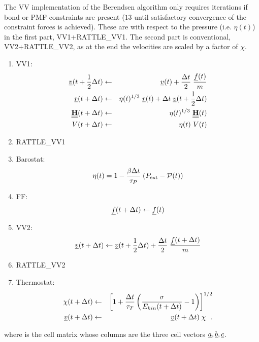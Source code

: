 The VV implementation of the Berendsen algorithm only requires iterations
if bond or PMF constraints are present ($13$ until satisfactory
convergence of the constraint forces is achieved).  These are
with respect to the pressure (i.e. $\eta (t)$) in the first part,
VV1+RATTLE\_VV1.  The second part is conventional, VV2+RATTLE\_VV2,
as at the end the velocities are scaled by a factor of $\chi$.
\begin{enumerate}
\item VV1:
\begin{eqnarray}
\mbox{$\underline{v}$}(t + {1 \over 2} \Delta t) &\leftarrow& \mbox{$\underline{v}$}(t) +
{\Delta t \over 2} \; {\mbox{$\underline{f}$}(t) \over m} \nonumber \\
\mbox{$\underline{r}$}(t + \Delta t) &\leftarrow& \eta (t)^{1/3}~\mbox{$\underline{r}$}(t) + \Delta t \;
\mbox{$\underline{v}$}(t + {1 \over 2} \Delta t) \\
\mbox{$\underline{\underline{\bf H}}$}(t + \Delta t) &\leftarrow&  \eta (t)^{1/3}~\mbox{$\underline{\underline{\bf H}}$}(t) \nonumber \\
V(t + \Delta t) &\leftarrow& \eta (t)~V(t) \nonumber
\end{eqnarray}
\item RATTLE\_VV1
\item Barostat:
\begin{equation}
\eta (t) = 1 - {\beta \Delta t \over \tau_{P}} \; (P_{\rm ext} -
{\cal P}(t))
\end{equation}
\item FF:
\begin{equation}
\mbox{$\underline{f}$}(t + \Delta t) \leftarrow \mbox{$\underline{f}$}(t)
\end{equation}
\item VV2:
\begin{equation}
\mbox{$\underline{v}$}(t + \Delta t) \leftarrow \mbox{$\underline{v}$}(t + {1 \over 2} \Delta t) +
{\Delta t \over 2} \; {\mbox{$\underline{f}$}(t + \Delta t) \over m}
\end{equation}
\item RATTLE\_VV2
\item Thermostat:
\begin{eqnarray}
\chi (t + \Delta t) &\leftarrow& \left[ 1 + {\Delta t \over \tau_{T}}
\left( {\sigma \over E_{kin}(t + \Delta t)} - 1 \right) \right]^{1/2} \nonumber \\
\mbox{$\underline{v}$}(t + \Delta t) &\leftarrow& \mbox{$\underline{v}$}(t + \Delta t) \; \chi~~.
\end{eqnarray}
\end{enumerate}
where  is the cell matrix whose columns are the three cell
vectors $\mbox{$\underline{a}$}, \mbox{$\underline{b}$}, \mbox{$\underline{c}$}$.

